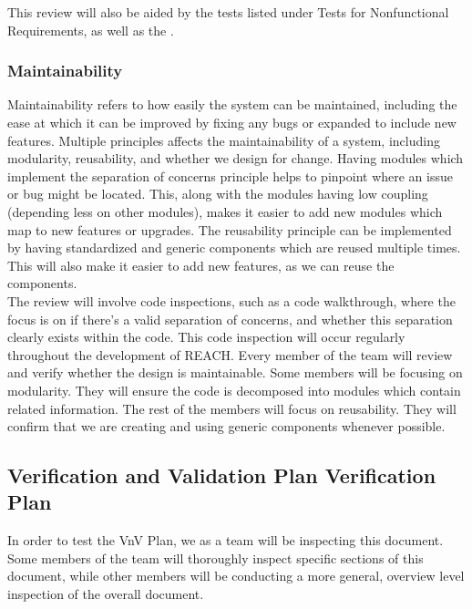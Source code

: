 \documentclass[12pt, titlepage]{article}
\begin{document}
This review will also be aided by the  tests listed under Tests for 
Nonfunctional Requirements, as well as the .

\subsubsection{Maintainability}

Maintainability refers to how easily the system can be maintained, including the ease at which 
it can be improved by fixing any bugs or expanded to include new features. Multiple principles 
affects the maintainability of a system, including modularity, reusability, and whether we design 
for change. Having modules which implement the separation of concerns principle helps to pinpoint 
where an issue or bug might be located. This, along with the modules having low coupling 
(depending less on other modules), makes it easier to add new modules which map to new features 
or upgrades. The reusability principle can be implemented by having standardized and generic 
components which are reused multiple times. This will also make it easier to add new features, 
as we can reuse the components.\\

The review will involve code inspections, such as a code walkthrough, where the focus is on if 
there's a valid separation of concerns, and whether this separation clearly exists within the 
code. This code inspection will occur regularly throughout the development of REACH. Every member 
of the team will review and verify whether the design is maintainable. Some members will be 
focusing on modularity. They will ensure the code is decomposed into modules which contain 
related information. The rest of the members will focus on reusability. They will confirm that 
we are creating and using generic components whenever possible.

\subsection{Verification and Validation Plan Verification Plan}

In order to test the VnV Plan, we as a team will be inspecting this document. Some members of the 
team will thoroughly inspect specific sections of this document, while other members will be 
conducting a more general, overview level inspection of the overall document.\\
\end{document}
